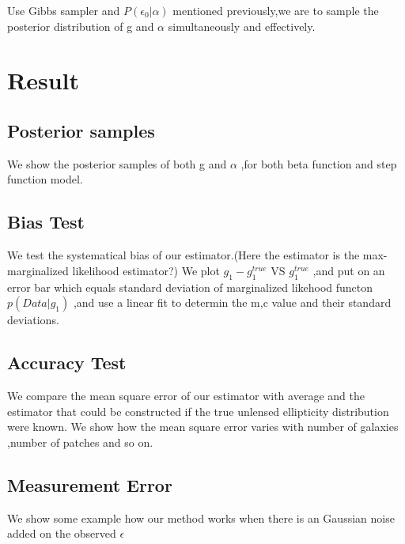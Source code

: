 \documentclass[useAMS,usenatbib]{mn2e}
\begin{document}
Use Gibbs sampler and $P(\epsilon_{0}|\alpha)$ mentioned previously,we
are to sample the posterior distribution of g and $\alpha$ simultaneously
and effectively.




\section{Result}

\label{sec:XXX}


\subsection{Posterior samples}

We show the posterior samples of both g and $\alpha$ ,for both beta
function and step function model. 


\subsection{Bias Test}

We test the systematical bias of our estimator.(Here the estimator
is the max-marginalized likelihood estimator?) We plot $g_{1}-g_{1}^{true}$
VS $g_{1}^{true}$ ,and put on an error bar which equals standard
deviation of marginalized likehood functon $p(Data|g_{1})$ ,and use
a linear fit to determin the m,c value and their standard deviations.


\subsection{Accuracy Test}

We compare the mean square error of our estimator with average and
the estimator that could be constructed if the true unlensed ellipticity
distribution were known. We show how the mean square error varies
with number of galaxies ,number of patches and so on.


\subsection{Measurement Error}

We show some example how our method works when there is an Gaussian
noise added on the observed $\epsilon$
\end{document}
